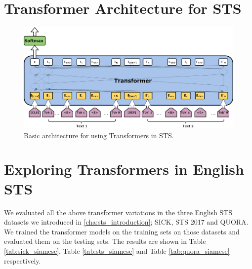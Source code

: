 \noindent 

\section{Transformer Architecture for STS}

\begin{figure}[ht]
	\centering
	\includegraphics[scale=0.4]{figures/semantic_textual_similarity/transformers/STSTransformers.png}
	\caption[Basic architecture for using Transformers in STS]{Basic architecture for using Transformers in STS.}
	\label{fig:sts_transformers}
\end{figure}

\section{Exploring Transformers in English STS}
We evaluated all the above transformer variations in the three English STS datasets we introduced in \ref{cha:sts_introduction}; SICK, STS 2017 and QUORA. We trained the transformer models on the training sets on those datasets and evaluated them on the testing sets. The results are shown in Table \ref{tab:sick_siamese}, Table \ref{tab:sts_siamese} and Table \ref{tab:quora_siamese} respectively. 

\begin{table}[htb]
	\centering
	\caption[Results for SICK with Transformer Models]{Results for SICK dataset with different variants of transformer models. For each variant, Pearson Correlation ($\bm{\rho}$) and Spearman Correlation ($\bm{\tau}$) are reported between the predicted values and the gold labels of the test set. Best result from all the variations is marked with ${\dagger}$.}  
	\label{tab:sick_transformers}
\end{table}


